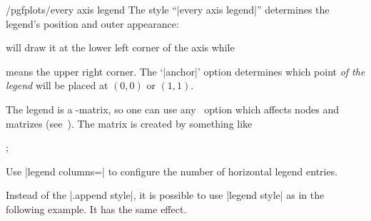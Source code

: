 {%
%


\begin{stylekey}{/pgfplots/every axis legend}
The style ``|every axis legend|'' determines the legend's position and outer appearance:
\begin{codeexample}
\end{codeexample}
will draw it at the lower left corner of the axis while
\begin{codeexample}
\end{codeexample}
means the upper right corner. The `|anchor|' option determines which point \emph{of the legend} will be placed at $(0,0)$ or $(1,1)$.

The legend is a \Tikz-matrix, so one can use any \Tikz\ option which affects
nodes and matrizes (see~\cite[section 13~and~14]{tikz}). The matrix is created by something like
\begin{codeexample}
;
\end{codeexample}

\begin{codeexample}[]
\end{codeexample}

Use |legend columns=| to configure the number of horizontal legend entries.
\begin{codeexample}[]
\end{codeexample}
\noindent
Instead of the |.append style|, it is possible to use |legend style| as in the following example. It has the same effect.


\end{stylekey}}
